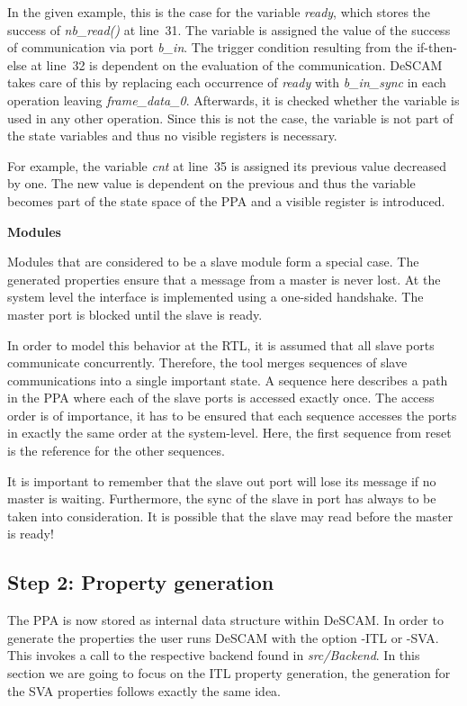 In the given example, this is the case for the variable \textit{ready}, which stores the success of \textit{nb\_read()} at line~31. 
The variable is assigned the value of the success of communication via port \textit{b\_in}. 
The trigger condition resulting from the if-then-else at line~32 is dependent on the evaluation of the communication. 
DeSCAM takes care of this by replacing each occurrence of \textit{ready} with \textit{b\_in\_sync} in each operation leaving \textit{frame\_data\_0}.
Afterwards, it is checked whether the variable is used in any other operation.
Since this is not the case, the variable is not part of the state variables and thus no visible registers is necessary. 
 
For example, the variable \textit{cnt} at line~35 is assigned its previous value decreased by one. 
The new value is dependent on the previous and thus the variable becomes part of the state space of the PPA and a visible register is introduced. 


\textbf{Modules}

Modules that are considered to be a slave module form a special case.
The generated properties ensure that a message from a master is never lost. 
At the system level the interface is implemented using a one-sided handshake.
The master port is blocked until the slave is ready.

In order to model this behavior at the RTL, it is assumed that all slave ports communicate concurrently. 
Therefore, the tool merges sequences of slave communications into a single important state. 
A sequence here describes a path in the PPA where each of the slave ports is accessed exactly once. 
The access order is of importance, it has to be ensured that each sequence accesses the ports in exactly the same order at the system-level. 
Here, the first sequence from reset is the reference for the other sequences.

It is important to remember that the slave out port will lose its message if no master is waiting. 
Furthermore, the sync of the slave in port has always to be taken into consideration. 
It is possible that the slave may read before the master is ready! 

\subsection{Step 2: Property generation}

The PPA is now stored as internal data structure within DeSCAM. 
In order to generate the properties the user runs DeSCAM with the option -ITL or -SVA.
This invokes a call to the respective backend found in \textit{src/Backend}. 
In this section we are going to focus on the ITL property generation, the generation for the SVA properties follows exactly the same idea. 

